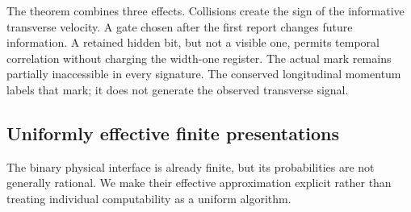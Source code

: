 The theorem combines three effects. Collisions create the sign of the
informative transverse velocity. A gate chosen after the first report
changes future information. A retained hidden bit, but not a visible
one, permits temporal correlation without charging the width-one
register. The actual mark remains partially inaccessible in every
signature. The conserved longitudinal momentum labels that mark; it
does not generate the observed transverse signal.

\subsection{Uniformly effective finite presentations}
The binary physical interface is already finite, but its probabilities
are not generally rational. We make their effective approximation
explicit rather than treating individual computability as a uniform
algorithm.

